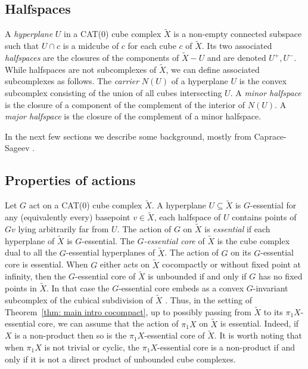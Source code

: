 \documentclass[12pt,oneside]{amsart}
\theoremstyle{definition}
\theoremstyle{definition}
\theoremstyle{remark}
\begin{document}
\subsection{Halfspaces}
A \emph{hyperplane} $U$ in a CAT(0) cube complex $\widetilde X$ is a non-empty connected subspace such that $U\cap c$ is a midcube of $c$ for each cube $c$ of $\widetilde X$. Its two associated \emph{halfspaces} are the closures of the components of  $\widetilde X-U$ and are denoted $U^+, U^-$. While halfspaces are not subcomplexes of $\widetilde X$, we can define associated subcomplexes as follows. 
The \emph{carrier} $N(U)$ of a hyperplane $U$ is the convex subcomplex consisting of the union of all cubes intersecting $U$.
A \emph{minor halfspace} is the closure of a component of the complement of the interior of $N(U)$. A \emph{major halfspace} is the closure of the complement of a minor halfspace.

In the next few sections we describe some background, mostly from Caprace-Sageev \cite{CapraceSageev2011}.


 
\subsection{Properties of actions}
Let $G$ act on a CAT(0) cube complex $\widetilde X$. A hyperplane $U\subseteq \widetilde X$ is $G$-essential for any (equivalently every) basepoint $v\in \widetilde X$, each halfspace of $U$ contains points of $Gv$ lying arbitrarily far from $U$. 
The action of $G$ on $\widetilde X$ is \emph{essential} if each hyperplane of $\widetilde X$ is $G$-essential. 
The \emph{$G$-essential core} of $\widetilde X$ is the cube complex dual to all the $G$-essential hyperplanes of $\widetilde X$. The action of $G$ on its $G$-essential core is essential. 
When $G$ either acts on $\widetilde X$ cocompactly or without fixed point at infinity, then the $G$-essential core of $\widetilde X$ is unbounded if and only if $G$ has no fixed points in $\widetilde X$. In that case the $G$-essential core embeds as a convex $G$-invariant subcomplex of the cubical subdivision of $\widetilde X$ \cite[Prop~3.5]{CapraceSageev2011}. Thus, in the setting of Theorem~\ref{thm: main intro cocompact}, up to possibly passing from $\widetilde X$ to its $\pi_1X$-essential core, we can assume that the action of $\pi_1X$ on $\widetilde X$ is essential. Indeed, if $X$ is a non-product then so is the $\pi_1X$-essential core of $\widetilde X$. It is worth noting that when $\pi_1X$ is not trivial or cyclic, the $\pi_1 X$-essential core is a non-product if and only if it is not a direct product of unbounded cube complexes.
\end{document}
